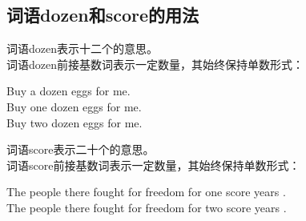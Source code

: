 \documentclass[UTF8]{ctexart}
\newcommand{\littf}[1]{{\hspace{3pt}\ttfamily #1}}
\begin{document}
\subsection{词语\littf{dozen}和\littf{score}的用法}
    词语\littf{dozen}表示十二个的意思。\\[3mm]
    词语\littf{dozen}前接基数词表示一定数量，其始终保持单数形式：\vspace{3pt}
    \begin{center}
        \ttfamily\large
        Buy {a dozen} eggs for me.\\[3mm]
        Buy {one dozen} eggs for me.\\[3mm]
        Buy {two dozen} eggs for me.\\[6mm]
    \end{center}
    词语\littf{score}表示二十个的意思。\\[3mm]
    词语\littf{score}前接基数词表示一定数量，其始终保持单数形式：\vspace{3pt}
    \begin{center}
        \ttfamily\large
        The people there fought for freedom for {one score} years .\\[3mm]
        The people there fought for freedom for {two score} years .
    \end{center}

\newpage
\end{document}
